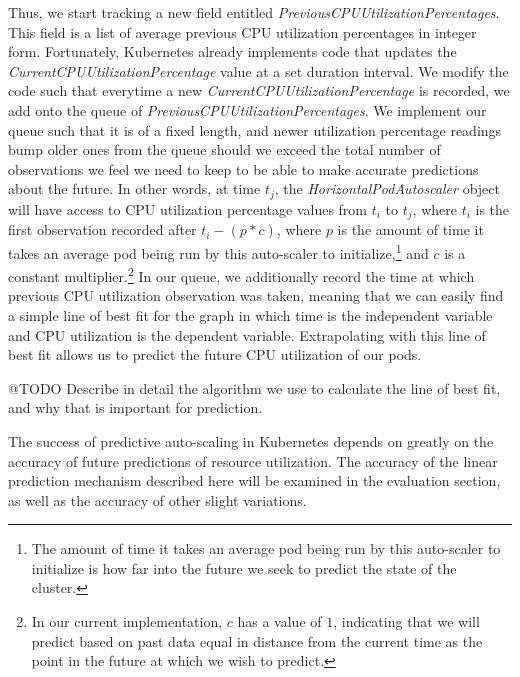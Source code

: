 Thus, we start tracking a new field entitled
\textit{PreviousCPUUtilizationPercentages}. This field is a list of average previous CPU
utilization percentages in integer form. Fortunately, Kubernetes already
implements code that updates the \textit{CurrentCPUUtilizationPercentage} value
at a set duration interval. We modify the code such that everytime a new
\textit{CurrentCPUUtilizationPercentage} is recorded, we add onto the queue of
\textit{PreviousCPUUtilizationPercentages}. We implement our queue such that it
is of a fixed length, and newer utilization percentage readings bump older ones
from the queue should we exceed the total number of observations we feel we need
to keep to be able to make accurate predictions about the future. In other words, at time
$t_{j}$, the \textit{HorizontalPodAutoscaler} object will have access to
CPU utilization percentage values from $t_{i}$ to $t_{j}$, where $t_{i}$ is the
first observation recorded after $t_{i} - (p * c)$, where $p$ is the
amount of time it takes an
average pod being run by this auto-scaler to initialize,\footnote{The
amount of time it takes an
average pod being run by this auto-scaler to initialize is how far into the
future we seek to predict the state of the cluster.} and $c$ is a constant
multiplier.\footnote{In our current implementation, $c$ has a value of
$1$, indicating that we will predict based on past data equal in distance from
the current time as the point in the future at which we wish to predict.}
In our queue, we additionally record the time at which previous CPU utilization
observation was taken, meaning that we can easily find a simple line of best fit
for the graph in which time is the independent variable and CPU utilization is
the dependent variable. Extrapolating with this line of best fit allows us to
predict the future CPU utilization of our pods.

@TODO Describe in detail the algorithm we use to calculate the line of best fit,
and why that is important for prediction.

The success of predictive auto-scaling in Kubernetes depends on greatly on the
accuracy of future predictions of resource utilization. The accuracy of the
linear prediction mechanism described here will be examined in the evaluation
section, as well as the accuracy of other slight variations.
